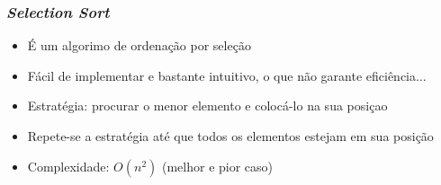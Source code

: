 \documentclass[aspectratio=169]{beamer}
\begin{document}
\begin{frame}\frametitle{\emph{Selection Sort}}
\begin{itemize}
	\item É um algorimo de ordenação por seleção
	\item Fácil de implementar e bastante intuitivo, o que não garante eficiência...
	\item Estratégia: procurar o menor elemento e colocá-lo na sua posiçao
	\item Repete-se a estratégia até que todos os elementos estejam em sua posição
	\item Complexidade: $O(n^2)$ (melhor e pior caso)
\end{itemize}
\end{frame}
\end{document}
